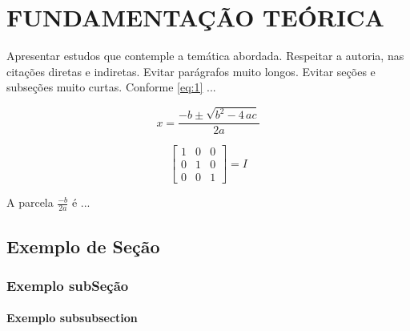 \chapter{FUNDAMENTAÇÃO TEÓRICA}
\label{cap:fundamentacao}


Apresentar estudos que contemple a temática abordada. Respeitar a autoria,
nas citações diretas e indiretas. Evitar parágrafos muito longos. Evitar seções e
subseções muito curtas. Conforme \ref{eq:1} ...

\begin{equation}
\label{eq:2}
x = \frac{{ - b \pm \sqrt {{b^2} - 4\,ac} }}{{2a}}
\end{equation}

\begin{equation}
\label{eq:1}
\left[ {\begin{array}{*{20}{c}}
	1&0&0\\
	0&1&0\\
	0&0&1
	\end{array}} \right] = I
\end{equation}



A parcela $ \frac{-b}{2a}$ é ...

\section{Exemplo de Seção}
\label{sec:apresentacao}


\subsection{Exemplo subSeção}

\subsubsection{Exemplo subsubsection}


